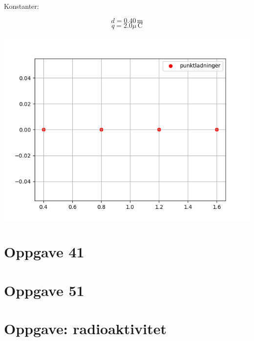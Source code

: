 \documentclass[a4paper,11pt]{article}
\begin{document}
\begin{minipage}{0.45\textwidth}

Konstanter:

$$d = 0.40\, \mathrm{m}$$
$$q = 2.0 \mu \, \mathrm{C}$$

\end{minipage}%
\begin{minipage}{0.55\textwidth}
  \includegraphics[width=\textwidth]{../oppgave_bilder/Oppgave19_26.png}
\end{minipage}

\newpage
\section*{Oppgave 41}


\newpage
\section*{Oppgave 51}


\newpage
\section*{Oppgave: radioaktivitet}
\end{document}
